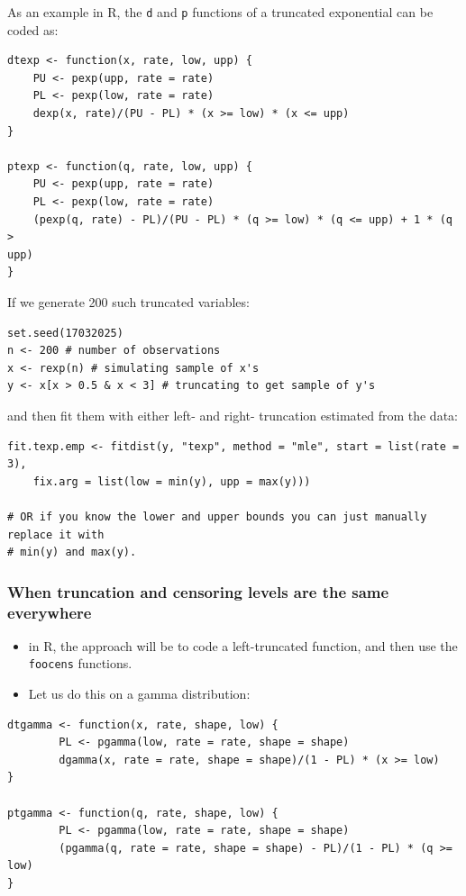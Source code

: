 \documentclass[11pt]{article}
\newcommand{\noi}{\noindent}
\begin{document}
\noi As an example in R, the \texttt{d} and \texttt{p} functions of a truncated exponential can
be coded as:
\begin{lstlisting}
dtexp <- function(x, rate, low, upp) {
    PU <- pexp(upp, rate = rate)
    PL <- pexp(low, rate = rate)
    dexp(x, rate)/(PU - PL) * (x >= low) * (x <= upp)
}

ptexp <- function(q, rate, low, upp) {
    PU <- pexp(upp, rate = rate)
    PL <- pexp(low, rate = rate)
    (pexp(q, rate) - PL)/(PU - PL) * (q >= low) * (q <= upp) + 1 * (q >
upp)
}
\end{lstlisting}

\noi If we generate 200 such truncated variables:
\begin{lstlisting}
set.seed(17032025)
n <- 200 # number of observations
x <- rexp(n) # simulating sample of x's
y <- x[x > 0.5 & x < 3] # truncating to get sample of y's
\end{lstlisting}

\noi and then fit them with either left- and right- truncation estimated from the data:
\begin{lstlisting}
fit.texp.emp <- fitdist(y, "texp", method = "mle", start = list(rate = 3),
    fix.arg = list(low = min(y), upp = max(y)))

# OR if you know the lower and upper bounds you can just manually replace it with 
# min(y) and max(y).
\end{lstlisting}

\subsubsection{When truncation and censoring levels are the same everywhere}
\begin{itemize}
    \item in R, the approach will be to code a left-truncated function, and then use the \texttt{foocens} functions.
    \item Let us do this on a gamma distribution:
\end{itemize}
\begin{lstlisting}
dtgamma <- function(x, rate, shape, low) {
        PL <- pgamma(low, rate = rate, shape = shape)
        dgamma(x, rate = rate, shape = shape)/(1 - PL) * (x >= low)
}

ptgamma <- function(q, rate, shape, low) {
        PL <- pgamma(low, rate = rate, shape = shape)
        (pgamma(q, rate = rate, shape = shape) - PL)/(1 - PL) * (q >= low)
}
\end{lstlisting}
\end{document}
